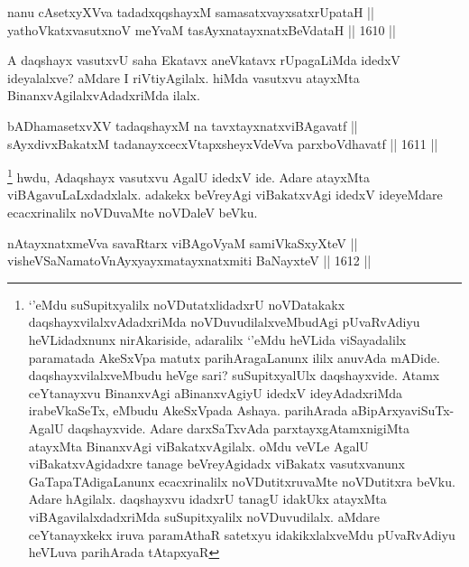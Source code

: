 
\begin{shl}
nanu cAsetxyXVva tadadxqqshayxM samasatxvayxsatxrUpataH || \\
yathoVkatxvasutxnoV meYvaM tasAyxnatayxnatxBeVdataH ||  1610 ||  
\end{shl}

\begin{artha}
A daqshayx vasutxvU saha Ekatavx aneVkatavx rUpagaLiMda idedxV ideyalalxve? aMdare I  riVtiyAgilalx. hiMda vasutxvu atayxMta BinanxvAgilalxvAdadxriMda ilalx.
\end{artha}


\begin{shl}
bADhamasetxvXV tadaqshayxM na tavxtayxnatxviBAgavatf || \\
sAyxdivxBakatxM tadanayxcecxVtapxsheyxVdeVva parxboVdhavatf ||  1611 ||  
\end{shl}

\begin{artha}
\footnote{`\stext'eMdu suSupitxyalilx noVDutatxlidadxrU noVDatakakx daqshayxvilalxvAdadxriMda noVDuvudilalxveMbudAgi pUvaRvAdiyu heVLidadxnunx nirAkariside, adaralilx `\stext'eMdu heVLida viSayadalilx paramatada AkeSxVpa matutx parihAragaLanunx ililx anuvAda mADide. daqshayxvilalxveMbudu heVge sari? suSupitxyalUlx daqshayxvide. Atamx ceYtanayxvu BinanxvAgi aBinanxvAgiyU idedxV ideyAdadxriMda irabeVkaSeTx, eMbudu AkeSxVpada Ashaya. parihArada aBipArxyaviSuTx- AgalU daqshayxvide. Adare darxSaTxvAda parxtayxgAtamxnigiMta atayxMta BinanxvAgi viBakatxvAgilalx. oMdu veVLe AgalU viBakatxvAgidadxre tanage beVreyAgidadx viBakatx vasutxvanunx GaTapaTAdigaLanunx ecacxrinalilx noVDutitxruvaMte noVDutitxra beVku. Adare hAgilalx. daqshayxvu idadxrU tanagU idakUkx atayxMta viBAgavilalxdadxriMda suSupitxyalilx noVDuvudilalx. aMdare ceYtanayxkekx iruva paramAthaR satetxyu idakikxlalxveMdu pUvaRvAdiyu heVLuva parihArada tAtapxyaR}
hwdu, Adaqshayx vasutxvu AgalU idedxV ide. Adare atayxMta viBAgavuLaLxdadxlalx. adakekx beVreyAgi viBakatxvAgi idedxV ideyeMdare ecacxrinalilx noVDuvaMte noVDaleV beVku.
\end{artha}


\begin{shl}
nAtayxnatxmeVva savaRtarx viBAgoV\s yaM samiVkaSxyXteV || \\
visheVSaNamatoV\s nAyxyayxmatayxnatxmiti BaNayxteV ||  1612 ||  
\end{shl}


